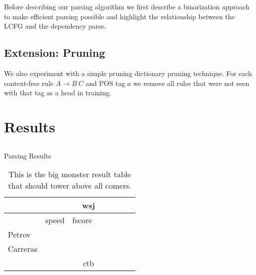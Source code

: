 \documentclass[11pt,letterpaper]{article}
\begin{document}
Before describing our parsing algorithm we first describe a binarization approach to make efficient parsing possible and highlight the relationship between the LCFG and the dependency parse.




\subsection{Extension: Pruning}

We also experiment with a simple pruning dictionary pruning technique.
For each context-free rule $A \rightarrow B\ C$ and POS tag $a$ we
remove all rules that were not seen with that tag as a head in training.



\subsection{}

\section{Results}


\subsection{}


\begin{table*}
  \centering
  Parsing Results


  \begin{tabular}{l|lllllll}
    \hline
    & \multicolumn{7}{|c}{wsj} \\
    \hline
    & speed & fscore \\
    \hline
    Petrov & & & \\
    Carreras & & & \\
    \hline
    \hline
    & \multicolumn{7}{|c}{ctb} \\
    \hline
  \end{tabular}
  \caption{This is the big monster result table that should tower above all comers. }
\end{table*}
\end{document}
